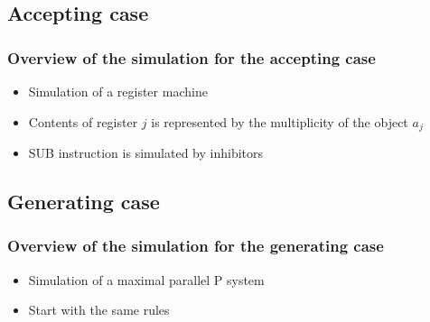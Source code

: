   \subsection{Accepting case} %
  \label{sub:accepting_case}
  

    \begin{frame}[t]\frametitle{Overview of the simulation for the accepting case}
      \begin{itemize}
        \item Simulation of a register machine
        \item Contents of register $j$ is represented by the multiplicity of the object $a_j$
        \item SUB instruction is simulated by inhibitors
      \end{itemize}
    \end{frame}
    \note{}


  \subsection{Generating case} %
  \label{sub:generating_case}

    \begin{frame}[t]\frametitle{Overview of the simulation for the generating case}
      \begin{itemize}
        \item Simulation of a maximal parallel P system
        \item Start with the same rules
      \end{itemize}
      \simulationpicture
    \end{frame}
    \note{}

